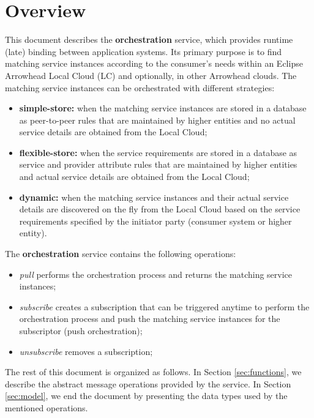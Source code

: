 \documentclass[a4paper]{arrowhead}
\begin{document}
\section{Overview}
\label{sec:overview}
This document describes the \textbf{orchestration} service, which provides runtime (late) binding between application systems. Its primary purpose is to find matching service instances according to the consumer's needs within an Eclipse Arrowhead Local Cloud (LC) and optionally, in other Arrowhead clouds. The matching service instances can be orchestrated with different strategies:

\begin{itemize}
    \item \textbf{simple-store:} when the matching service instances are stored in a database as peer-to-peer rules that are maintained by higher entities and no actual service details are obtained from the Local Cloud;
    \item \textbf{flexible-store:} when the service requirements are stored in a database as service and provider attribute rules that are maintained by higher entities and actual service details are obtained from the Local Cloud;
    \item \textbf{dynamic:} when the matching service instances and their actual service details are discovered on the fly from the Local Cloud based on the service requirements specified by the initiator party (consumer system or higher entity).
\end{itemize}


The \textbf{orchestration} service contains the following operations:

\begin{itemize}
    \item \textit{pull} performs the orchestration process and returns the matching service instances;
    \item \textit{subscribe} creates a subscription that can be triggered anytime to perform the orchestration process and push the matching service instances for the subscriptor (push orchestration);
    \item \textit{unsubscribe} removes a subscription;
\end{itemize}

The rest of this document is organized as follows.
In Section \ref{sec:functions}, we describe the abstract message operations provided by the service.
In Section \ref{sec:model}, we end the document by presenting the data types used by the mentioned operations.
\end{document}

